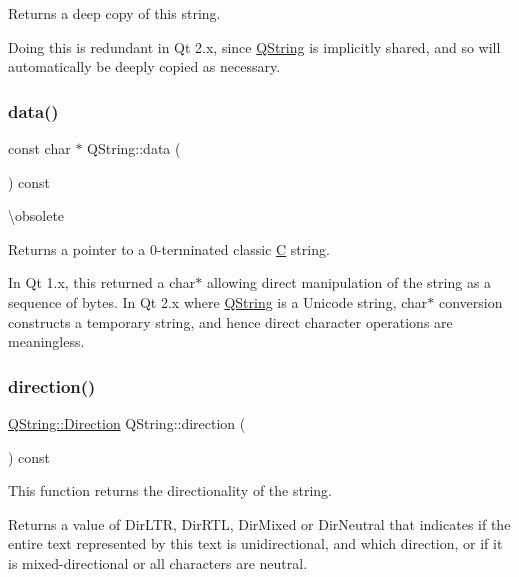 Returns a deep copy of this string.

Doing this is redundant in Qt 2.\+x, since \mbox{\hyperlink{class_q_string}{Q\+String}} is implicitly shared, and so will automatically be deeply copied as necessary. \mbox{\label{class_q_string_a3fd84b8263c26c6539fe6f5ea1055ee5}} 
\subsubsection{\texorpdfstring{data()}{data()}}
{\footnotesize\ttfamily const char $\ast$ Q\+String\+::data (\begin{DoxyParamCaption}{ }\end{DoxyParamCaption}) const\hspace{0.3cm}{\ttfamily [inline]}}

\textbackslash{}obsolete

Returns a pointer to a 0-\/terminated classic \mbox{\hyperlink{class_c}{C}} string.

In Qt 1.\+x, this returned a char$\ast$ allowing direct manipulation of the string as a sequence of bytes. In Qt 2.\+x where \mbox{\hyperlink{class_q_string}{Q\+String}} is a Unicode string, char$\ast$ conversion constructs a temporary string, and hence direct character operations are meaningless. \mbox{\label{class_q_string_a0fc0ce8cad187317ef119383e38c6457}} 
\subsubsection{\texorpdfstring{direction()}{direction()}}
{\footnotesize\ttfamily \mbox{\hyperlink{class_q_string_acaff43b133319ea651f19aac6b967406}{Q\+String\+::\+Direction}} Q\+String\+::direction (\begin{DoxyParamCaption}{ }\end{DoxyParamCaption}) const}

This function returns the directionality of the string.

\begin{DoxyReturn}{Returns}
a value of Dir\+L\+TR, Dir\+R\+TL, Dir\+Mixed or Dir\+Neutral that indicates if the entire text represented by this text is unidirectional, and which direction, or if it is mixed-\/directional or all characters are neutral. 
\end{DoxyReturn}
\mbox{\label{class_q_string_a261151b9ce7096b9af4a9588bb5d038a}} 
